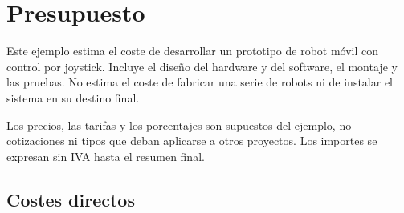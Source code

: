 %

\chapter{Presupuesto}
\label{cha:presupuesto}

Este ejemplo estima el coste de desarrollar un prototipo de robot móvil con
control por joystick. Incluye el diseño del hardware y del software, el
montaje y las pruebas. No estima el coste de fabricar una serie de robots ni
de instalar el sistema en su destino final.

Los precios, las tarifas y los porcentajes son supuestos del ejemplo, no
cotizaciones ni tipos que deban aplicarse a otros proyectos. Los importes
se expresan sin IVA hasta el resumen final.

\section{Costes directos}
\label{sec:presupuesto-directos}


